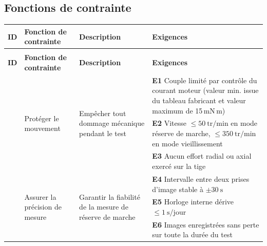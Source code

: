 \begin{landscape}
\begin{longtable}{|>{\raggedright\arraybackslash}p{1cm}|p{4cm}|p{6cm}|p{10.5cm}|}
\end{longtable}


\newpage
\subsection{Fonctions de contrainte}

\label{tab:cahier-fc}
\begin{longtable}{|>{\raggedright\arraybackslash}p{1cm}|p{4.5cm}|p{5.5cm}|p{10.5cm}|}
\hline
\textbf{ID} & \textbf{Fonction de contrainte} & \textbf{Description} & \textbf{Exigences} \\
\hline
\endfirsthead

\multicolumn{4}{c}{\tablename\ \thetable{} (suite)} \\
\hline
\textbf{ID} & \textbf{Fonction de contrainte} & \textbf{Description} & \textbf{Exigences} \\
\hline
\endhead

\hline
\endfoot

\multirow{3}{*}{FC1} & \multirow{3}{4.5cm}{Protéger le mouvement} & \multirow{3}{5.5cm}{Empêcher tout dommage mécanique pendant le test}
    & \rule[-0.4\baselineskip]{0pt}{1.8\baselineskip}\textbf{E1} Couple limité par contrôle du courant moteur (valeur min. issue du tableau fabricant et valeur maximum de 15\,mN\,m) \\
\cline{4-4}
 & & & \rule[-0.4\baselineskip]{0pt}{1.8\baselineskip}\textbf{E2} Vitesse $\leq 50\ \mathrm{tr/min}$ en mode réserve de marche, $\leq 350\ \mathrm{tr/min}$ en mode vieillissement \\
\cline{4-4}
 & & & \rule[-0.4\baselineskip]{0pt}{1.8\baselineskip}\textbf{E3} Aucun effort radial ou axial exercé sur la tige \\
\hline

\multirow{3}{*}{FC2} & \multirow{3}{4.5cm}{Assurer la précision de mesure} & \multirow{3}{5.5cm}{Garantir la fiabilité de la mesure de réserve de marche}
    & \rule[-0.4\baselineskip]{0pt}{1.8\baselineskip}\textbf{E4} Intervalle entre deux prises d'image stable à $\pm 30\ \mathrm{s}$ \\
\cline{4-4}
 & & & \rule[-0.4\baselineskip]{0pt}{1.8\baselineskip}\textbf{E5} Horloge interne dérive $\leq 1\ \mathrm{s/jour}$ \\
\cline{4-4}
 & & & \rule[-0.4\baselineskip]{0pt}{1.8\baselineskip}\textbf{E6} Images enregistrées sans perte sur toute la durée du test \\
\hline


\end{longtable}
\end{landscape}
